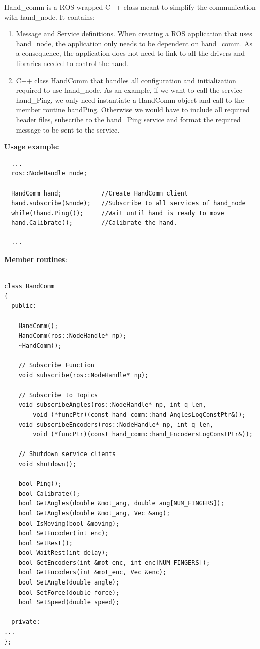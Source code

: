 \documentclass[letterpaper,notitlepage,11pt]{article}
\begin{document}
\noindent Hand\_comm is a ROS wrapped C++ class meant to simplify the
communication with hand\_node. It contains:

\begin{enumerate}
\item Message and Service definitions. When creating a ROS application
  that uses hand\_node, the application only needs to be dependent
  on hand\_comm. As a consequence, the application does not need to
  link to all the drivers and libraries needed to control the hand. 
\item C++ class HandComm that handles all configuration and
  initialization required to use hand\_node. As an example, if we want
  to call the service hand\_Ping, we only need instantiate a HandComm
  object and call to the member routine handPing. Otherwise
  we would have to include all required header files, subscribe to the
  hand\_Ping service and format the required message to be sent to the
  service.
\end{enumerate}

\textbf{\underline{Usage example:}}

\begin{verbatim}
  ...
  ros::NodeHandle node;
 
  HandComm hand;           //Create HandComm client
  hand.subscribe(&node);   //Subscribe to all services of hand_node
  while(!hand.Ping());     //Wait until hand is ready to move
  hand.Calibrate();        //Calibrate the hand.

  ...
\end{verbatim}


\textbf{\underline{Member routines}}:

\begin{verbatim}

class HandComm
{
  public:

    HandComm();
    HandComm(ros::NodeHandle* np);
    ~HandComm();

    // Subscribe Function
    void subscribe(ros::NodeHandle* np);

    // Subscribe to Topics
    void subscribeAngles(ros::NodeHandle* np, int q_len, 
        void (*funcPtr)(const hand_comm::hand_AnglesLogConstPtr&));
    void subscribeEncoders(ros::NodeHandle* np, int q_len, 
        void (*funcPtr)(const hand_comm::hand_EncodersLogConstPtr&));

    // Shutdown service clients
    void shutdown();

    bool Ping();
    bool Calibrate();
    bool GetAngles(double &mot_ang, double ang[NUM_FINGERS]);
    bool GetAngles(double &mot_ang, Vec &ang);
    bool IsMoving(bool &moving);
    bool SetEncoder(int enc);
    bool SetRest();
    bool WaitRest(int delay);
    bool GetEncoders(int &mot_enc, int enc[NUM_FINGERS]);
    bool GetEncoders(int &mot_enc, Vec &enc);
    bool SetAngle(double angle);
    bool SetForce(double force);
    bool SetSpeed(double speed);

  private:
...
};

\end{verbatim}


%

\end{document}
